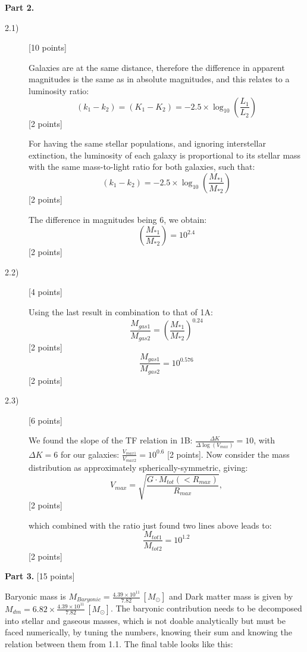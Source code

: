 \textbf{Part 2.}

\begin{description}
\item[2.1)] \hfill[10 points]

  Galaxies are at the same distance, therefore the difference in apparent
  magnitudes is the same as in absolute magnitudes, and this relates to a
  luminosity ratio:
  \[ (k_1 - k_2) = (K_1 - K_2)
     = -2.5\times\log_{10}\!\left(\frac{L_1}{L_2}\right) \]
  \hfill[2 points]

  For having the same stellar populations, and ignoring interstellar
  extinction, the luminosity of each galaxy is proportional to its
  stellar mass with the same mass-to-light ratio for both galaxies, such
  that:
  \[ (k_1 - k_2) = -2.5\times\log_{10}
     \!\left(\frac{M_{*1}}{M_{*2}}\right) \]
  \hfill[2 points]

  The difference in magnitudes being 6, we obtain:
  \[ \left(\frac{M_{*1}}{M_{*2}}\right) = 10^{2.4} \]
  \hfill[2 points]

\item[2.2)] \hfill[4 points]

  Using the last result in combination to that of 1A:
  \[ \frac{M_{gas1}}{M_{gas2}}
     = \left(\frac{M_{*1}}{M_{*2}}\right)^{0.24} \]
  \hfill[2 points]
  \[ \frac{M_{gas1}}{M_{gas2}} = 10^{0.576} \]
  \hfill[2 points]

\item[2.3)] \hfill[6 points]

  We found the slope of the TF relation in 1B:
  $\frac{\Delta K}{\Delta\log(V_{max})} = 10$, with $\Delta K = 6$ for
  our galaxies: $\frac{V_{max1}}{V_{max2}} = 10^{0.6}$ [2 points]. Now
  consider the mass distribution as approximately
  spherically-symmetric, giving:
  \[ V_{max} = \sqrt{\frac{G\cdot M_{tot}(<R_{max})}{R_{max}}}, \]
  \hfill[2 points]

  which combined with the ratio just found two lines above leads to:
  \[ \frac{M_{tot1}}{M_{tot2}} = 10^{1.2} \]
  \hfill[2 points]
\end{description}

\textbf{Part 3.} \hfill[15 points]

Baryonic mass is
$M_{Baryonic} = \frac{4.39\times 10^{11}}{7.82}\,[M_\odot]$ and Dark
matter mass is given by
$M_{dm} = 6.82\times\frac{4.39\times 10^{11}}{7.82}\,[M_\odot]$. The
baryonic contribution needs to be decomposed into stellar and gaseous
masses, which is not doable analytically but must be faced numerically,
by tuning the numbers, knowing their sum and knowing the relation between
them from 1.1. The final table looks like this:


